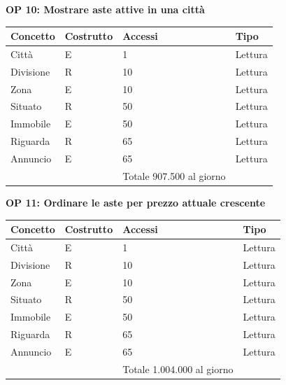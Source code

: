 \documentclass[a4paper,12pt]{report}
\begin{document}
            \textbf{OP 10: Mostrare aste attive in una città}
        	\begin{table}[h!]
            \centering
             \begin{tabular}{||l l l l||}
             \hline
             Concetto & Costrutto & Accessi & Tipo \\ [0.5ex] 
             \hline\hline
             Città & E & 1 & Lettura \\ 
             Divisione & R & 10 & Lettura \\ 
             Zona & E & 10 & Lettura \\ 
             Situato & R & 50 & Lettura \\ 
             Immobile & E & 50 & Lettura \\ 
             Riguarda & R & 65 & Lettura \\ 
             Annuncio & E & 65 & Lettura \\ 
             \hline
                &   & Totale  907.500 al giorno &  \\ [1ex] 
             \hline
             \end{tabular}
            \end{table}

            \textbf{OP 11: Ordinare le aste per prezzo attuale crescente}
        	\begin{table}[h!]
            \centering
             \begin{tabular}{||l l l l||}
             \hline
             Concetto & Costrutto & Accessi & Tipo \\ [0.5ex] 
             \hline\hline
             Città & E & 1 & Lettura \\ 
             Divisione & R & 10 & Lettura \\ 
             Zona & E & 10 & Lettura \\ 
             Situato & R & 50 & Lettura \\ 
             Immobile & E & 50 & Lettura \\ 
             Riguarda & R & 65 & Lettura \\ 
             Annuncio & E & 65 & Lettura \\ 
             \hline
                &   & Totale  1.004.000 al giorno &  \\ [1ex] 
             \hline
             \end{tabular}
            \end{table}
\end{document}
